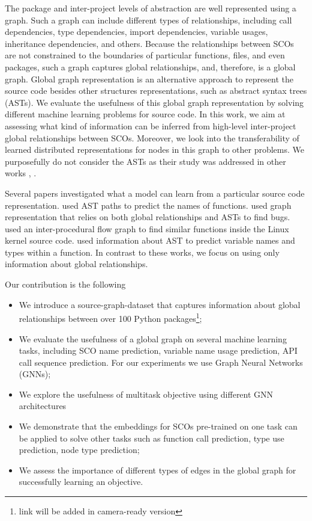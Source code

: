 \documentclass[a4paper,twoside]{article}
\begin{document}
The package and inter-project levels of abstraction are well represented using a graph. Such a graph can include different types of relationships, including call dependencies, type dependencies, import dependencies, variable usages, inheritance dependencies, and others. Because the relationships between SCOs are not constrained to the boundaries of particular functions, files, and even packages, such a graph captures global relationships, and, therefore, is a global graph. Global graph representation is an alternative approach to represent the source code besides other structures representations, such as abstract syntax trees (ASTs). We evaluate the usefulness of this global graph representation by solving different machine learning problems for source code. In this work, we aim at assessing what kind of information can be inferred from high-level inter-project global relationships between SCOs. Moreover, we look into the transferability of learned distributed representations for nodes in this graph to other problems. We purposefully do not consider the ASTs as their study was addressed in other works \cite{Alon2018}, \cite{Yahav2018}.

Several papers investigated what a model can learn from a particular source code representation. \cite{Alon2018a} used AST paths to predict the names of functions. \cite{Allamanis2017} used graph representation that relies on both global relationships and ASTs to find bugs. \cite{DeFreez2018} used an inter-procedural flow graph to find similar functions inside the Linux kernel source code. \cite{Raychev2015} used information about AST to predict variable names and types within a function. In contrast to these works, we focus on using only information about global relationships. 

Our contribution is the following
\begin{itemize}
    \item We introduce a source-graph-dataset that captures information about global relationships between over 100 Python packages\footnote{link will be added in camera-ready version};
    \item We evaluate the usefulness of a global graph on several machine learning tasks, including SCO name prediction, variable name usage prediction, API call sequence prediction. For our experiments we use Graph Neural Networks (GNNs);
    \item We explore the usefulness of multitask objective using different GNN architectures
    \item We demonstrate that the embeddings for SCOs pre-trained on one task can be applied to solve other tasks such as function call prediction, type use prediction, node type prediction;
    \item We assess the importance of different types of edges in the global graph for successfully learning an objective. 
\end{itemize}
\end{document}

